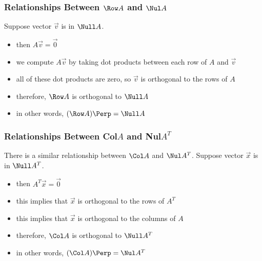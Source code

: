 \begin{frame} \frametitle{Relationships Between $\Row A$ and $\Nul A$} 

    
    Suppose vector $ \vec v$ is in $ \Null A$.
    
    \vspace{4pt}

    \begin{itemize}  \setlength\itemsep{1em}
    
        \item<1-> then $ A \vec v =  \vec 0$
        
        \item<2-> we compute $A\vec v$ by taking dot products between each row of $A$ and $\vec v$
        
        \item<3-> all of these dot products are zero, so $ \vec v$ is orthogonal to the rows of $A$

        \item<4-> therefore, $\Row A  $ is  orthogonal to $\Null A $
        
        \item<5-> in other words, $(\Row A)\Perp = \Null A$

    \end{itemize}
    
    \vspace{4pt}
    
\end{frame}


\begin{frame} \frametitle{Relationships Between Col$A$ and Nul$A^T$} 

    There is a similar relationship between $\Col A$ and $\Nul A^T$. Suppose vector $ \vec x$ is in $ \Null A^T$.

    \begin{itemize}  \setlength\itemsep{1em}
        \item<1-> then $ A^T \vec x =  \vec 0$
        
        \item<2-> this implies that $ \vec x$ is orthogonal to the rows of $ A^T$

        \item<3-> this implies that $ \vec x$ is orthogonal to the columns of $ A$

        \item<4-> therefore, $\Col A  $ is  orthogonal to $\Null A^T $
        
        \item<5-> in other words, $(\Col A)\Perp = \Nul A^T$

    \end{itemize}
    
    
\end{frame}




